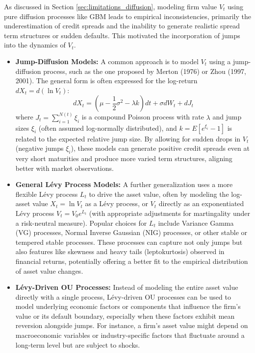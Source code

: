\documentclass[11pt,twoside,openright]{report}
\begin{document}
As discussed in Section \ref{sec:limitations_diffusion}, modeling firm value $V_t$ using pure diffusion processes like GBM leads to empirical inconsistencies, primarily the underestimation of credit spreads and the inability to generate realistic spread term structures or sudden defaults. This motivated the incorporation of jumps into the dynamics of $V_t$.

\begin{itemize}
    \item \textbf{Jump-Diffusion Models:} A common approach is to model $V_t$ using a jump-diffusion process, such as the one proposed by Merton (1976) or Zhou (1997, 2001). The general form is often expressed for the log-return $dX_t = d(\ln V_t)$:
    \[ dX_t = (\mu - \frac{1}{2}\sigma^2 - \lambda k)dt + \sigma dW_t + dJ_t \]
    where $J_t = \sum_{i=1}^{N(t)} \xi_i$ is a compound Poisson process with rate $\lambda$ and jump sizes $\xi_i$ (often assumed log-normally distributed), and $k = E[e^{\xi_i} - 1]$ is related to the expected relative jump size. By allowing for sudden drops in $V_t$ (negative jumps $\xi_i$), these models can generate positive credit spreads even at very short maturities and produce more varied term structures, aligning better with market observations.

    \item \textbf{General Lévy Process Models:} A further generalization uses a more flexible Lévy process $L_t$ to drive the asset value, often by modeling the log-asset value $X_t = \ln V_t$ as a Lévy process, or $V_t$ directly as an exponentiated Lévy process $V_t = V_0 e^{L_t}$ (with appropriate adjustments for martingality under a risk-neutral measure). Popular choices for $L_t$ include Variance Gamma (VG) processes, Normal Inverse Gaussian (NIG) processes, or other stable or tempered stable processes. These processes can capture not only jumps but also features like skewness and heavy tails (leptokurtosis) observed in financial returns, potentially offering a better fit to the empirical distribution of asset value changes.

    \item \textbf{Lévy-Driven OU Processes:} Instead of modeling the entire asset value directly with a single process, Lévy-driven OU processes can be used to model underlying economic factors or components that influence the firm's value or its default boundary, especially when these factors exhibit mean reversion alongside jumps. For instance, a firm's asset value might depend on macroeconomic variables or industry-specific factors that fluctuate around a long-term level but are subject to shocks.
\end{itemize}
\end{document}
